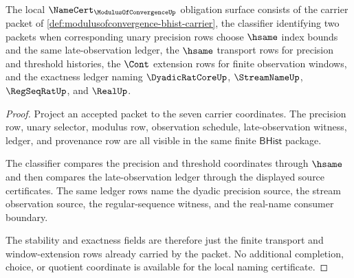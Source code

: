 \begin{theorem}\label{thm:modulusofconvergence-namecert-obligation-surface}
The local $\NameCert_{\ModulusOfConvergenceUp}$ obligation surface consists of
the carrier packet of \autoref{def:modulusofconvergence-bhist-carrier}, the
classifier identifying two packets when corresponding unary precision rows
choose $\hsame$ index bounds and the same late-observation ledger, the
$\hsame$ transport rows for precision and threshold histories, the $\Cont$
extension rows for finite observation windows, and the exactness ledger naming
$\DyadicRatCoreUp$, $\StreamNameUp$, $\RegSeqRatUp$, and $\RealUp$.
\end{theorem}
\begin{proof}
Project an accepted packet to the seven carrier coordinates. The precision row,
unary selector, modulus row, observation schedule, late-observation witness,
ledger, and provenance row are all visible in the same finite $\mathsf{BHist}$
package.

The classifier compares the precision and threshold coordinates through
$\hsame$ and then compares the late-observation ledger through the displayed
source certificates. The same ledger rows name the dyadic precision source, the
stream observation source, the regular-sequence witness, and the real-name
consumer boundary.

The stability and exactness fields are therefore just the finite transport and
window-extension rows already carried by the packet. No additional completion,
choice, or quotient coordinate is available for the local naming certificate.
\end{proof}

